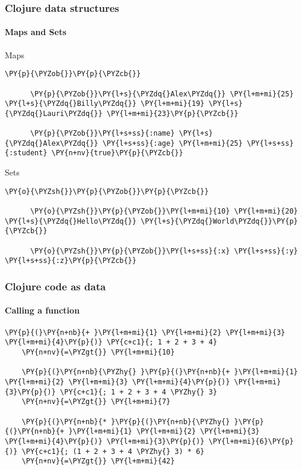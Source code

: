 \begin{frame}[fragile]
  \frametitle{Clojure data structures}
  \framesubtitle{Maps and Sets}

  \begin{block}{Maps}
    \begin{Verbatim}[commandchars=\\\{\}]
      \PY{p}{\PYZob{}}\PY{p}{\PYZcb{}}

      \PY{p}{\PYZob{}}\PY{l+s}{\PYZdq{}Alex\PYZdq{}} \PY{l+m+mi}{25} \PY{l+s}{\PYZdq{}Billy\PYZdq{}} \PY{l+m+mi}{19} \PY{l+s}{\PYZdq{}Lauri\PYZdq{}} \PY{l+m+mi}{23}\PY{p}{\PYZcb{}}

      \PY{p}{\PYZob{}}\PY{l+s+ss}{:name} \PY{l+s}{\PYZdq{}Alex\PYZdq{}} \PY{l+s+ss}{:age} \PY{l+m+mi}{25} \PY{l+s+ss}{:student} \PY{n+nv}{true}\PY{p}{\PYZcb{}}
    \end{Verbatim}
  \end{block}

  \begin{block}{Sets}
    \begin{Verbatim}[commandchars=\\\{\}]
      \PY{o}{\PYZsh{}}\PY{p}{\PYZob{}}\PY{p}{\PYZcb{}}

      \PY{o}{\PYZsh{}}\PY{p}{\PYZob{}}\PY{l+m+mi}{10} \PY{l+m+mi}{20} \PY{l+s}{\PYZdq{}Hello\PYZdq{}} \PY{l+s}{\PYZdq{}World\PYZdq{}}\PY{p}{\PYZcb{}}

      \PY{o}{\PYZsh{}}\PY{p}{\PYZob{}}\PY{l+s+ss}{:x} \PY{l+s+ss}{:y} \PY{l+s+ss}{:z}\PY{p}{\PYZcb{}}
    \end{Verbatim}
  \end{block}
\end{frame}


\begin{frame}[fragile]
  \frametitle{Clojure code as data}
  \framesubtitle {Calling a function}


  \begin{Verbatim}[commandchars=\\\{\}]
    \PY{p}{(}\PY{n+nb}{+ }\PY{l+m+mi}{1} \PY{l+m+mi}{2} \PY{l+m+mi}{3} \PY{l+m+mi}{4}\PY{p}{)} \PY{c+c1}{; 1 + 2 + 3 + 4}
    \PY{n+nv}{=\PYZgt{}} \PY{l+m+mi}{10}

    \PY{p}{(}\PY{n+nb}{\PYZhy{} }\PY{p}{(}\PY{n+nb}{+ }\PY{l+m+mi}{1} \PY{l+m+mi}{2} \PY{l+m+mi}{3} \PY{l+m+mi}{4}\PY{p}{)} \PY{l+m+mi}{3}\PY{p}{)} \PY{c+c1}{; 1 + 2 + 3 + 4 \PYZhy{} 3}
    \PY{n+nv}{=\PYZgt{}} \PY{l+m+mi}{7}

    \PY{p}{(}\PY{n+nb}{* }\PY{p}{(}\PY{n+nb}{\PYZhy{} }\PY{p}{(}\PY{n+nb}{+ }\PY{l+m+mi}{1} \PY{l+m+mi}{2} \PY{l+m+mi}{3} \PY{l+m+mi}{4}\PY{p}{)} \PY{l+m+mi}{3}\PY{p}{)} \PY{l+m+mi}{6}\PY{p}{)} \PY{c+c1}{; (1 + 2 + 3 + 4 \PYZhy{} 3) * 6}
    \PY{n+nv}{=\PYZgt{}} \PY{l+m+mi}{42}
  \end{Verbatim}
\end{frame}




